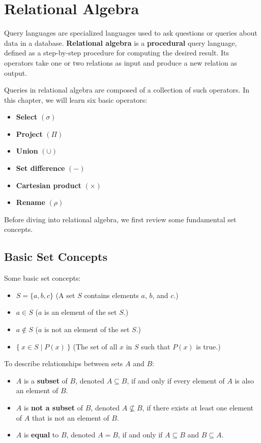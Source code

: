 \section{Relational Algebra}
Query languages are specialized languages used to ask questions or queries about data in a database. \textbf{Relational algebra} is a \textbf{procedural} query language, defined as a step-by-step procedure for computing the desired result. Its operators take one or two relations as input and produce a new relation as output. 

Queries in relational algebra are composed of a collection of such operators. In this chapter, we will learn six basic operators:

\begin{itemize}
  \item \textbf{Select} \((\sigma)\) 
  \item \textbf{Project} \((\Pi)\)
  \item \textbf{Union} \((\cup)\) 
  \item \textbf{Set difference} \((-)\) 
  \item \textbf{Cartesian product} \((\times)\) 
  \item \textbf{Rename} \((\rho)\) 
\end{itemize}

Before diving into relational algebra, we first review some fundamental set concepts.

\subsection{Basic Set Concepts}
Some basic set concepts:
\begin{itemize}
  \item \(S = \{a, b, c\}\) \hfill (A set \(S\) contains elements \(a\), \(b\), and \(c\).)
  \item \(a \in S\) \hfill (\(a\) is an element of the set \(S\).)
  \item \(a \notin S\) \hfill (\(a\) is not an element of the set \(S\).)
  \item \(\{\ x \in S \mid P(x) \ \}\) \hfill (The set of all \(x\) in \(S\) such that \(P(x)\) is true.)
\end{itemize}

To describe relationships between sets \(A\) and \(B\): 
\begin{itemize}
  \item \(A\) is a \textbf{subset} of \(B\), denoted \(A \subseteq B\), if and only if every element of \(A\) is also an element of \(B\).
  \item \(A\) is \textbf{not a subset} of \(B\), denoted \(A \nsubseteq B\), if there exists at least one element of \(A\) that is not an element of \(B\).
  \item \(A\) is \textbf{equal} to \(B\), denoted \(A = B\), if and only if \(A \subseteq B\) and \(B \subseteq A\).
\end{itemize}

